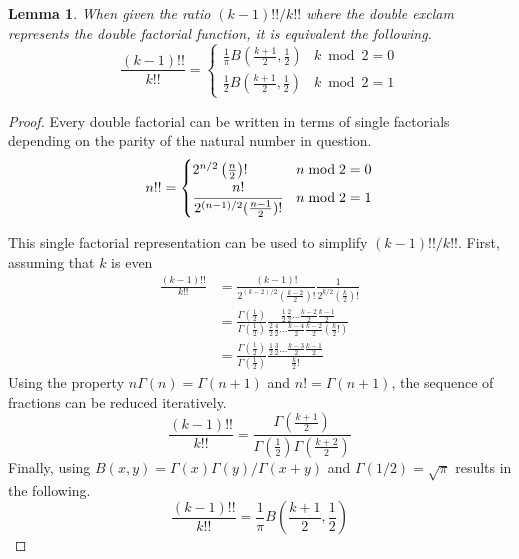 \documentclass{article}
\newtheorem{lemma}{Lemma}
\begin{document}
\begin{lemma} \label{prop:double fac beta}
	When given the ratio $(k-1)!!/k!!$ where the double exclam represents the double factorial function, it is equivalent the following.
	\begin{equation}
		\frac{(k-1)!!}{k!!}= \begin{cases}
			\frac{1}{\pi}B(\frac{k+1}{2}, \frac{1}{2}) & k\bmod 2=0\\
			\frac{1}{2}B(\frac{k+1}{2}, \frac{1}{2}) & k\bmod 2=1
		\end{cases}
	\end{equation}
\end{lemma}
\begin{proof}
	Every double factorial can be written in terms of single factorials depending on the parity of the natural number in question.
	\begin{equation} \label{eq:single factorial}
		n!! = \begin{cases}
			2^{n/2}\left(\frac{n}{2}\right)! & n \bmod 2 = 0 \\
			\cfrac{n!}{2^{(n-1)/2}(\frac{n-1}{2})!} & n \bmod 2 = 1
		\end{cases}
	\end{equation}

	This single factorial representation can be used to simplify $(k-1)!!/k!!$. First, assuming that $k$ is even
	\begin{align}
		\frac{(k-1)!!}{k!!} &= \frac{(k-1)!}{2^{(k-2)/2}(\frac{k-2}{2})!}\frac{1}{2^{k/2}(\frac{k}{2})!} \\
		&= \frac{\Gamma(\frac{1}{2})}{\Gamma(\frac{1}{2})}\frac{\frac{1}{2}\frac{2}{2}\hdots\frac{k-2}{2}\frac{k-1}{2}}{\frac{2}{2}\frac{4}{2}\hdots\frac{k-4}{2}\frac{k-2}{2}(\frac{k}{2}!)} \\
		&= \frac{\Gamma(\frac{1}{2})}{\Gamma(\frac{1}{2})}\frac{\frac{1}{2}\frac{3}{2}\hdots\frac{k-3}{2}\frac{k-1}{2}}{\frac{k}{2}!}
	\end{align}
	Using the property $n\Gamma(n)=\Gamma(n+1)$ and $n! = \Gamma(n+1)$, the sequence of fractions can be reduced iteratively.
	\begin{equation}
		\frac{(k-1)!!}{k!!} = \frac{\Gamma(\frac{k+1}{2})}{\Gamma(\frac{1}{2})\Gamma(\frac{k+2}{2})}
	\end{equation}
	Finally, using $B(x,y)=\Gamma(x)\Gamma(y)/\Gamma(x+y)$ and $\Gamma(1/2) = \sqrt{\pi}$ results in the following.
	\begin{equation}
		\frac{(k-1)!!}{k!!} = \frac{1}{\pi}B\left(\frac{k+1}{2}, \frac{1}{2}\right)
	\end{equation}


\end{proof}
\end{document}
